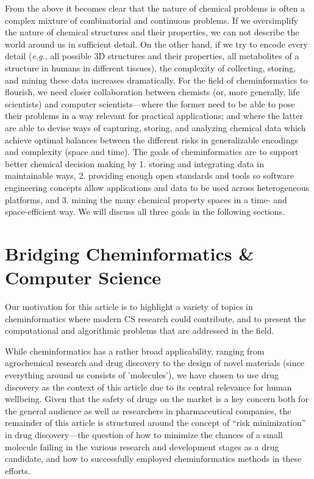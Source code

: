 \documentclass{sig-alternate}
\begin{document}
From the above it becomes clear that the nature of chemical problems
is often a complex mixture of combinatorial and continuous
problems. If we oversimplify the nature of chemical structures and
their properties, we can not describe the world around us in
sufficient detail. On the other hand, if we try to encode every detail
(\emph{e.g.}, all possible 3D structures and their properties, all
metabolites of a structure in humans in different tissues), the
complexity of collecting, storing, and mining these data increases
dramatically. For the field of cheminformatics to flourish, we need
closer collaboration between chemists (or, more generally, life
scientists) and computer scientists---where the former need to be able
to pose their problems in a way relevant for practical applications;
and where the latter are able to devise ways of capturing, storing,
and analyzing chemical data which achieve optimal balances between the different risks in
generalizable encodings and complexity (space and time). The goals of cheminformatics are to
support better chemical decision making by 1. storing and integrating
data in maintainable ways, 2.  providing enough open standards and
tools so software engineering concepts allow applications and data to
be used across heterogeneous platforms, and 3. mining the many
chemical property spaces in a time- and space-efficient way. We will
discuss all three goals in the following sections.

\section{Bridging Cheminformatics \& Computer Science}

Our motivation for this article is to highlight a variety of topics in
cheminformatics where modern CS research could contribute, and
to present the computational and algorithmic problems
that are addressed in the field.

While cheminformatics has a rather broad applicability, ranging from
agrochemical research and drug discovery to the design of novel
materials (since everything around us consists of 'molecules'), we have chosen to use drug discovery as the context of this
article due to its central relevance for human wellbeing. Given that the safety of drugs on the market is a key concern both for the general audience as well as researchers in pharmaceutical companies, the remainder of this article is structured around the
concept of ``risk minimization'' in drug discovery---the question of how to minimize the chances of a small molecule failing in the various research and development stages as a drug candidate, and how to successfully employed cheminformatics methods in these efforts.
\end{document}
